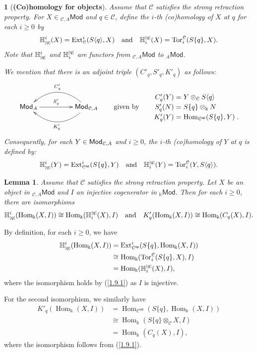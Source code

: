 \documentclass{amsart}
\theoremstyle{bfupright head,slanted body}
\theoremstyle{bfupright head,upright body}
\newtheorem{bfhpg}[res]{}               \newtheorem*{bfhpg*}{}
\theoremstyle{fixed bf head,slanted body}
\newtheorem{lem}[res]{Lemma}            \newtheorem*{lem*}{Lemma}
\theoremstyle{fixed bf head,upright body}
\theoremstyle{numbered paragraph}
\newenvironment{prf*}[1][Proof]{%
	\begin{proof}[\bf #1]
		\setcounter{equation}{0}
		\renewcommand{\theequation}{\arabic{equation}}}
	{\end{proof}
}
\numberwithin{equation}{res}
\newcommand{\Mod}[1]{{_{#1}\mathsf{Mod}}}
\newcommand{\Hom}[3][]{\operatorname{Hom}_{#1}(#2,#3)}
\newcommand{\Ext}[4][]{\operatorname{Ext}_{#1}^{#2}(#3,#4)}
\newcommand{\Tor}[4][]{\operatorname{Tor}_{#2}^{#1}(#3,#4)}
\newcommand{\hH}[2][1]{\mathbb{H}_{#1}^{\textnormal{\tiny[}#2\textnormal{\tiny]}}}
\newcommand{\cH}[2][1]{\mathbb{H}^{#1}_{\textnormal{\tiny[}#2\textnormal{\tiny]}}}
\newcommand{\C}{\mathcal{C}}
\newcommand{\kk}{\Bbbk}
\newcommand{\is}{\cong}
\newcommand{\rMod}[1]{{\sf{Mod}}_{#1}}
\newcommand{\Cop}{\mathcal{C}^{\mathsf{op}}}
\begin{document}
\begin{bfhpg}[\bf (Co)homology for objects]
Assume that $\C$ satisfies the strong retraction property. For $X\in\Mod{\C,A}$ and $q\in\C$, define the $i$-th (co)homology of $X$ at $q$ for each $i\geqslant0$ by
\[\cH[i]{q}(X)=\Ext[\C]{i}{S\langle q\rangle}{X}
\quad \text{and} \quad
\hH[i]{q}(X)=\Tor[\C]{i}{S\{q\}}{X}.\]
Note that $\cH[i]{q}$ and $\hH[i]{q}$ are functors from $\Mod{\C,A}$ to $\Mod{A}$.

We mention that there is an adjoint triple $(C'_{q},S'_{q},K'_{q})$ as follows:
  \begin{equation*}
  \xymatrix@C=4pc{
    \rMod{A}
    \ar[r]^-{S'_{q}}
    &
    \rMod{\C,A}
    \ar@/_1.8pc/[l]_-{C'_{q}}
    \ar@/^1.8pc/[l]^-{K'_{q}}
  }
  \qquad \text{given by} \qquad
  {\setlength\arraycolsep{1.5pt}
   \renewcommand{\arraystretch}{1.2}
  \begin{array}{rcl}
  C'_q(Y) &=& Y \otimes_\C S\langle q\rangle \\
  S'_q(N) &=& S\{q\}\otimes_\kk N \\
  K'_{q}(Y) &=& \Hom[\C^{\sf op}]{S\{q\}}{Y}\;.
  \end{array}
  }
  \end{equation*}
Consequently, for each $Y\in\rMod{\C,A}$ and $i\geqslant0$, the $i$-th (co)homology of $Y$ at $q$ is defined by:
\[
\cH[i]{q}(Y)=\Ext[\C^{\sf op}]{i}{S\{ q\}}{Y}
\quad \text{and} \quad
\hH[i]{q}(Y)=\Tor[\C]{i}{Y}{S\langle q\rangle}.
\]
\end{bfhpg}

\begin{lem}\label{homology}
Assume that $\C$ satisfies the strong retraction property. Let $X$ be an object in $\Mod{\C,A}$ and $I$ an injective cogenerator in $\Mod{\Bbbk}$. Then for each $i\geqslant 0$, there are isomorphisms
\[\cH[i]{q}(\Hom[\Bbbk]{X}{I})\is\Hom[\Bbbk]{\hH[i]{q}(X)}{I}
\quad
\text{and}
\quad
K'_q(\Hom[\Bbbk]{X}{I})\is\Hom[\Bbbk]{C_q(X)}{I}.\]
\end{lem}

\begin{prf*}
By definition, for each $i\geq 0$, we have
\begin{align*}
\cH[i]{q}(\Hom[\Bbbk]{X}{I})&=\Ext[\Cop]{i}{S\{ q\}}{\Hom[\Bbbk]{X}{I}}\\
&\cong\Hom[\Bbbk]{\Tor[\C]{i}{S\{q\}}{X}}{I}\\
&=\Hom[\Bbbk]{\hH[i]{q}(X)}{I},
\end{align*}
where the isomorphism holds by (\ref{1.9.1}) as $I$ is injective.

For the second isomorphism, we similarly have
\begin{align*}
K'_q(\Hom[\Bbbk]{X}{I})&=\Hom[\Cop]{S\{q\}}{\Hom[\Bbbk]{X}{I}}\\
&\cong\Hom[\Bbbk]{S\{q\}\otimes_\C X}{I}\\
&=\Hom[\Bbbk]{C_q(X)}{I},
\end{align*}
where the isomorphism follows from (\ref{1.9.1}).
\end{prf*}
\end{document}
